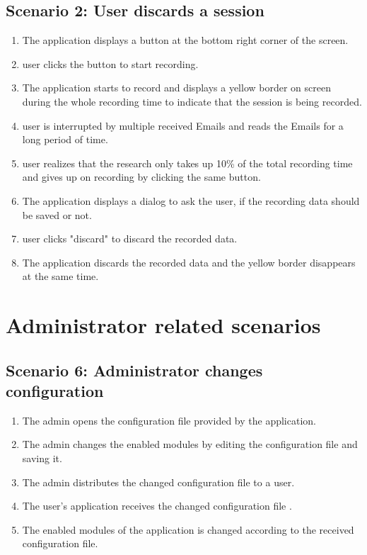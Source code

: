 \subsection{Scenario 2: User discards a session}
\begin{enumerate}
    \item The application displays a button at the bottom right corner of the screen.
    \item \Gls{user} clicks the button to start recording.
    \item The application starts to record and displays a yellow border on screen during the whole recording time to indicate that the \gls{session} is being recorded.
    \item \Gls{user} is interrupted by multiple received Emails and reads the Emails for a long period of time.
    \item \Gls{user} realizes that the research only takes up 10\% of the total recording time and gives up on recording by clicking the same button.
    \item The application displays a dialog to ask the \gls{user}, if the recording data should be saved or not.
    \item \Gls{user} clicks "discard" to discard the recorded data.
    \item The application discards the recorded data and the yellow border disappears at the same time.
\end{enumerate}

\setcounter{subsection}{3} %
\setcounter{subsection}{4} %

\setcounter{section}{2} %

\section{Administrator related scenarios}
\subsection{Scenario 6: Administrator changes configuration}
\begin{enumerate}
    \item The \gls{admin} opens the configuration file provided by the application.
    \item The \gls{admin} changes the enabled modules by editing the configuration file and saving it.
    \item The \gls{admin} distributes the changed configuration file to a \gls{user}.
    \item The \gls{user}'s application receives the changed configuration file .
    \item The enabled modules of the application is changed according to the received configuration file.
\end{enumerate}


